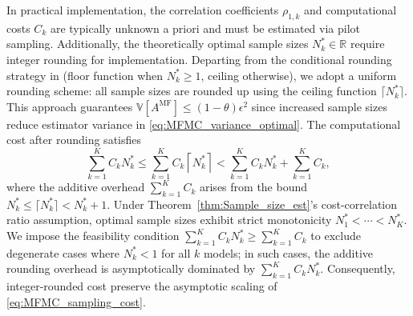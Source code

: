 In practical implementation, the correlation coefficients $\rho_{1,k}$ and computational costs $C_k$ are typically unknown a priori and must be estimated via pilot sampling. Additionally, the theoretically optimal sample sizes $N_k^* \in \mathbb{R}$ require integer rounding for implementation. Departing from the conditional rounding strategy in \cite{GrGuJuWa:2023, PeWiGu:2016} (floor function when $N_k^* \ge 1$, ceiling otherwise), we adopt a uniform rounding scheme: all sample sizes are rounded up using the ceiling function $\lceil N_k^* \rceil$. 
This approach guarantees $\mathbb{V}[A^{\mathrm{MF}}] \leq (1-\theta)\epsilon^2$ since increased sample sizes reduce estimator variance in \eqref{eq:MFMC_variance_optimal}. The computational cost after rounding satisfies
%
\begin{equation}\label{eq:sampling_cost_bound}
    \sum_{k=1}^K C_k N_k^*\le \sum_{k=1}^K C_k \left\lceil N_k^*\right\rceil<\sum_{k=1}^K C_k N_k^* + \sum_{k=1}^K C_k,
\end{equation}
%
where the additive overhead $\sum_{k=1}^K C_k$ arises from the bound $N_k^*\le \lceil N_k^*\rceil< N_k^*+1$. Under Theorem~\ref{thm:Sample_size_est}'s cost-correlation ratio assumption, optimal sample sizes exhibit strict monotonicity $N_1^* < \cdots < N_K^*$. We impose the feasibility condition $\sum_{k=1}^K C_k N_k^* \geq \sum_{k=1}^K C_k$ to exclude degenerate cases where $N_k^* < 1$ for all $k$ models; in such cases, the additive rounding overhead is asymptotically dominated by $\sum_{k=1}^K C_k N_k^*$. Consequently, integer-rounded cost preserve the asymptotic scaling of \eqref{eq:MFMC_sampling_cost}.



